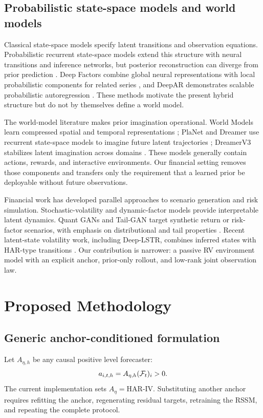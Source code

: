 \documentclass[11pt]{article}
\begin{document}
\subsection{Probabilistic state-space models and world models}
Classical state-space models specify latent transitions and observation equations. Probabilistic recurrent state-space models extend this structure with neural transitions and inference networks, but posterior reconstruction can diverge from prior prediction \cite{doerr2018}. Deep Factors combine global neural representations with local probabilistic components for related series \cite{wang2019}, and DeepAR demonstrates scalable probabilistic autoregression \cite{salinas2020}. These methods motivate the present hybrid structure but do not by themselves define a world model.

The world-model literature makes prior imagination operational. World Models learn compressed spatial and temporal representations \cite{ha2018}; PlaNet and Dreamer use recurrent state-space models to imagine future latent trajectories \cite{planet2019,hafner2019}; DreamerV3 stabilizes latent imagination across domains \cite{hafner2025}. These models generally contain actions, rewards, and interactive environments. Our financial setting removes those components and transfers only the requirement that a learned prior be deployable without future observations.

Financial work has developed parallel approaches to scenario generation and risk simulation. Stochastic-volatility and dynamic-factor models provide interpretable latent dynamics. Quant GANs and Tail-GAN target synthetic return or risk-factor scenarios, with emphasis on distributional and tail properties \cite{wiese2020,cont2025}. Recent latent-state volatility work, including Deep-LSTR, combines inferred states with HAR-type transitions \cite{lim2026}. Our contribution is narrower: a passive RV environment model with an explicit anchor, prior-only rollout, and low-rank joint observation law.

\section{Proposed Methodology}
\subsection{Generic anchor-conditioned formulation}
Let $A_{\eta,h}$ be any causal positive level forecaster:
\begin{equation}a_{i,t,h}=A_{\eta,h}(\mathcal F_t)_i>0.\end{equation}
The current implementation sets $A_\eta=\text{HAR-IV}$. Substituting another anchor requires refitting the anchor, regenerating residual targets, retraining the RSSM, and repeating the complete protocol.
\end{document}
